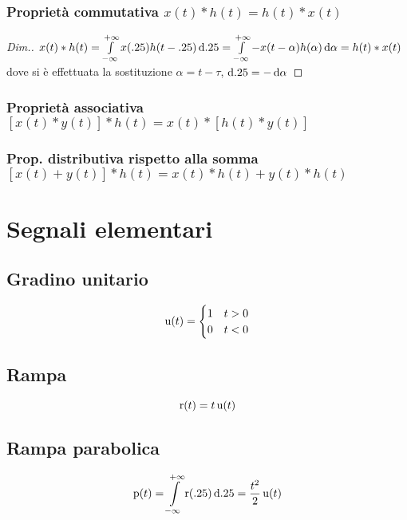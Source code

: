 \subsubsection{Proprietà commutativa $x(t)\ast h(t)= h(t)\ast x(t)$}
\begin{proof}[Dim.]
$x(t)\ast h(t)=\int\limits_{-\infty}^{+\infty}{x(.25)h(t-.25)}{\,\mathop{}\!\mathrm{d}{.25}}=\int\limits_{-\infty}^{+\infty}{-x(t-\alpha)h(\alpha)}{\,\mathop{}\!\mathrm{d}{\alpha}}=h(t)\ast x(t)$ dove si è effettuata la sostituzione $\alpha=t-\tau$, $\mathop{}\!\mathrm{d}.25=-\mathop{}\!\mathrm{d}\alpha$
\end{proof}
\subsubsection{Proprietà associativa $[x(t)\ast y(t)]\ast h(t)= x(t)\ast [h(t)\ast y(t)]$}
\subsubsection{Prop. distributiva rispetto alla somma $[x(t)+y(t)]\ast h(t)= x(t)\ast h(t)+y(t)\ast h(t)$}

\section{Segnali elementari}

\subsection{Gradino unitario}
\[ \operatorname{u}(t)=\begin{cases}
1 & t>0 \\
0 & t<0
\end{cases}
\]
\subsection{Rampa}
\[ \operatorname{r}(t)=t\operatorname{u}(t) \]
\subsection{Rampa parabolica}
\[ \operatorname{p}(t)=\int\limits_{-\infty}^{+\infty}{\operatorname{r}(.25)}{\,\mathop{}\!\mathrm{d}{.25}}=\frac{t^2}{2}\operatorname{u}(t)
\]


